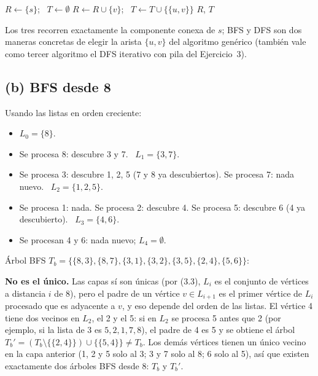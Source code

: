 \begin{algorithm}[H]
\caption{Exploración genérica de la componente de $s$ (libro, sección 3.2)}
\begin{algorithmic}[1]
  \State $R\gets\{s\}$; \ $T\gets\emptyset$
    \State $R\gets R\cup\{v\}$; \ $T\gets T\cup\{\{u,v\}\}$
  \EndWhile
  \State \Return $R$, $T$
\EndFunction
\end{algorithmic}
\end{algorithm}
Los tres recorren exactamente la componente conexa de $s$; BFS y DFS son dos maneras concretas de
elegir la arista $\{u,v\}$ del algoritmo genérico (también vale como tercer algoritmo el DFS
iterativo con pila del Ejercicio~3).

\subsection*{(b) BFS desde 8}
Usando las listas en orden creciente:
\begin{itemize}[nosep]
  \item $L_0=\{8\}$.
  \item Se procesa 8: descubre 3 y 7. \ $L_1=\{3,7\}$.
  \item Se procesa 3: descubre 1, 2, 5 (7 y 8 ya descubiertos). Se procesa 7: nada nuevo. \ $L_2=\{1,2,5\}$.
  \item Se procesa 1: nada. Se procesa 2: descubre 4. Se procesa 5: descubre 6 (4 ya descubierto). \ $L_3=\{4,6\}$.
  \item Se procesan 4 y 6: nada nuevo; $L_4=\emptyset$.
\end{itemize}
Árbol BFS $T_b=\{\{8,3\},\{8,7\},\{3,1\},\{3,2\},\{3,5\},\{2,4\},\{5,6\}\}$:
\begin{center}
\end{center}
\textbf{No es el único.} Las capas sí son únicas (por (3.3), $L_i$ es el conjunto de vértices a
distancia $i$ de 8), pero el padre de un vértice $v\in L_{i+1}$ es el primer vértice de $L_i$
procesado que es adyacente a $v$, y eso depende del orden de las listas. El vértice 4 tiene dos
vecinos en $L_2$, el 2 y el 5: si en $L_2$ se procesa 5 antes que 2 (por ejemplo, si la lista de 3 es
$5,2,1,7,8$), el padre de 4 es 5 y se obtiene el árbol
$T_b'=(T_b\setminus\{\{2,4\}\})\cup\{\{5,4\}\}\neq T_b$. Los demás vértices tienen un único vecino en
la capa anterior (1, 2 y 5 solo al 3; 3 y 7 solo al 8; 6 solo al 5), así que existen exactamente
dos árboles BFS desde 8: $T_b$ y $T_b'$.

